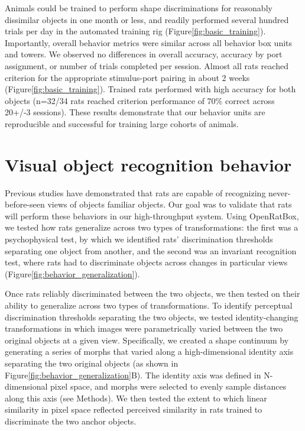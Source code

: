 Animals could be trained to perform shape discriminations for reasonably dissimilar objects in one month or less, and readily performed several hundred trials per day in the automated training rig (Figure\ref{fig:basic_training}). Importantly, overall behavior metrics were similar across all behavior box units and towers. We observed no differences in overall accuracy, accuracy by port assignment, or number of trials completed per session. Almost all rats reached criterion for the appropriate stimulus-port pairing in about 2 weeks (Figure\ref{fig:basic_training}). Trained rats performed with high accuracy for both objects (n=32/34 rats reached criterion performance of 70\% correct across 20+/-3 sessions). These results demonstrate that our behavior units are reproducible and successful for training large cohorts of animals. 

\section{Visual object recognition behavior}
Previous studies have demonstrated that rats are capable of recognizing never-before-seen views of objects familiar objects\cite{Zoccolan2009, Vermaercke2012, Tafazoli2012Transformation-TolerantPriming}. Our goal was to validate that rats will perform these behaviors in our high-throughput system. Using OpenRatBox, we tested how rats generalize across two types of transformations: the first was a psychophysical test, by which we identified rats’ discrimination thresholds separating one object from another, and the second was an invariant recognition test, where rats had to discriminate objects across changes in particular views (Figure\ref{fig:behavior_generalization}). 

Once rats reliably discriminated between the two objects, we then tested on their ability to generalize across two types of transformations. To identify perceptual discrimination thresholds separating the two objects, we tested identity-changing transformations in which images were parametrically varied between the two original objects at a given view. Specifically, we created a shape continuum by generating a series of morphs that varied along a high-dimensional identity axis separating the two original objects (as shown in Figure\ref{fig:behavior_generalization}B). The identity axis was defined in N-dimensional pixel space, and morphs were selected to evenly sample distances along this axis (see Methods). We then tested the extent to which linear similarity in pixel space reflected perceived similarity in rats trained to discriminate the two anchor objects. 

